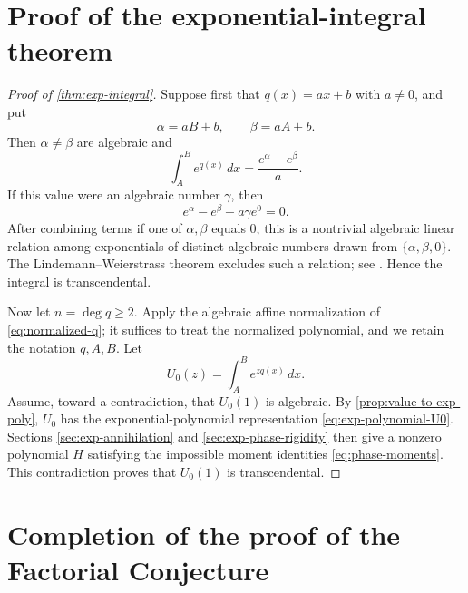 \documentclass[11pt]{article}
\numberwithin{equation}{section}
\theoremstyle{definition}
\theoremstyle{remark}
\begin{document}
\section{Proof of the exponential-integral theorem}\label{sec:exp-main-proof}

\begin{proof}[Proof of \cref{thm:exp-integral}]
Suppose first that $q(x)=ax+b$ with $a\ne0$, and put
\[
  \alpha=aB+b,
  \qquad
  \beta=aA+b.
\]
Then $\alpha\ne\beta$ are algebraic and
\[
  \int_A^B e^{q(x)}\,dx
  =\frac{e^\alpha-e^\beta}{a}.
\]
If this value were an algebraic number $\gamma$, then
\[
  e^\alpha-e^\beta-a\gamma e^0=0.
\]
After combining terms if one of $\alpha,\beta$ equals $0$, this is a nontrivial algebraic linear relation among exponentials of distinct algebraic numbers drawn from $\{\alpha,\beta,0\}$.  The Lindemann--Weierstrass theorem excludes such a relation; see \cite[Chapter~1]{Baker}.  Hence the integral is transcendental.

Now let $n=\deg q\ge2$.  Apply the algebraic affine normalization of \cref{eq:normalized-q}; it suffices to treat the normalized polynomial, and we retain the notation $q,A,B$.  Let
\[
  U_0(z)=\int_A^B e^{zq(x)}\,dx.
\]
Assume, toward a contradiction, that $U_0(1)$ is algebraic.  By \cref{prop:value-to-exp-poly}, $U_0$ has the exponential-polynomial representation \eqref{eq:exp-polynomial-U0}.  Sections \ref{sec:exp-annihilation} and \ref{sec:exp-phase-rigidity} then give a nonzero polynomial $H$ satisfying the impossible moment identities \eqref{eq:phase-moments}.  This contradiction proves that $U_0(1)$ is transcendental.
\end{proof}



\section{Completion of the proof of the Factorial Conjecture}\label{sec:FC-proof}
\end{document}
